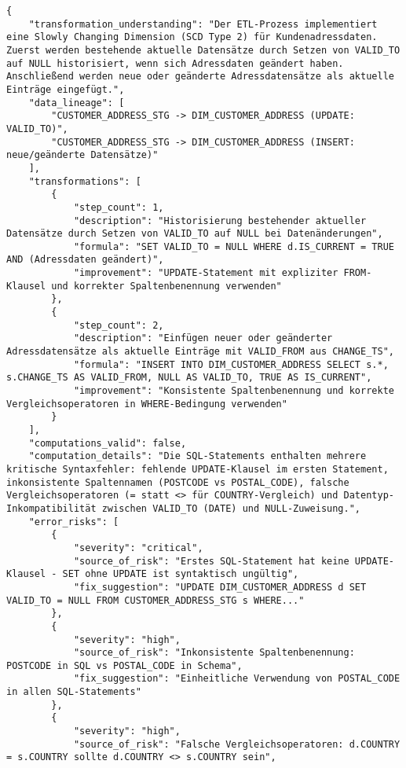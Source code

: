 \begin{lstlisting}[caption={Ausgabe: Claude Sonnet 4 Anwendungsfall 9 Robustheitsdurchlauf},label={claude_case9_prompt3}]
{
    "transformation_understanding": "Der ETL-Prozess implementiert eine Slowly Changing Dimension (SCD Type 2) für Kundenadressdaten. Zuerst werden bestehende aktuelle Datensätze durch Setzen von VALID_TO auf NULL historisiert, wenn sich Adressdaten geändert haben. Anschließend werden neue oder geänderte Adressdatensätze als aktuelle Einträge eingefügt.",
    "data_lineage": [
        "CUSTOMER_ADDRESS_STG -> DIM_CUSTOMER_ADDRESS (UPDATE: VALID_TO)",
        "CUSTOMER_ADDRESS_STG -> DIM_CUSTOMER_ADDRESS (INSERT: neue/geänderte Datensätze)"
    ],
    "transformations": [
        {
            "step_count": 1,
            "description": "Historisierung bestehender aktueller Datensätze durch Setzen von VALID_TO auf NULL bei Datenänderungen",
            "formula": "SET VALID_TO = NULL WHERE d.IS_CURRENT = TRUE AND (Adressdaten geändert)",
            "improvement": "UPDATE-Statement mit expliziter FROM-Klausel und korrekter Spaltenbenennung verwenden"
        },
        {
            "step_count": 2,
            "description": "Einfügen neuer oder geänderter Adressdatensätze als aktuelle Einträge mit VALID_FROM aus CHANGE_TS",
            "formula": "INSERT INTO DIM_CUSTOMER_ADDRESS SELECT s.*, s.CHANGE_TS AS VALID_FROM, NULL AS VALID_TO, TRUE AS IS_CURRENT",
            "improvement": "Konsistente Spaltenbenennung und korrekte Vergleichsoperatoren in WHERE-Bedingung verwenden"
        }
    ],
    "computations_valid": false,
    "computation_details": "Die SQL-Statements enthalten mehrere kritische Syntaxfehler: fehlende UPDATE-Klausel im ersten Statement, inkonsistente Spaltennamen (POSTCODE vs POSTAL_CODE), falsche Vergleichsoperatoren (= statt <> für COUNTRY-Vergleich) und Datentyp-Inkompatibilität zwischen VALID_TO (DATE) und NULL-Zuweisung.",
    "error_risks": [
        {
            "severity": "critical",
            "source_of_risk": "Erstes SQL-Statement hat keine UPDATE-Klausel - SET ohne UPDATE ist syntaktisch ungültig",
            "fix_suggestion": "UPDATE DIM_CUSTOMER_ADDRESS d SET VALID_TO = NULL FROM CUSTOMER_ADDRESS_STG s WHERE..."
        },
        {
            "severity": "high",
            "source_of_risk": "Inkonsistente Spaltenbenennung: POSTCODE in SQL vs POSTAL_CODE in Schema",
            "fix_suggestion": "Einheitliche Verwendung von POSTAL_CODE in allen SQL-Statements"
        },
        {
            "severity": "high",
            "source_of_risk": "Falsche Vergleichsoperatoren: d.COUNTRY = s.COUNTRY sollte d.COUNTRY <> s.COUNTRY sein",

\end{lstlisting}
